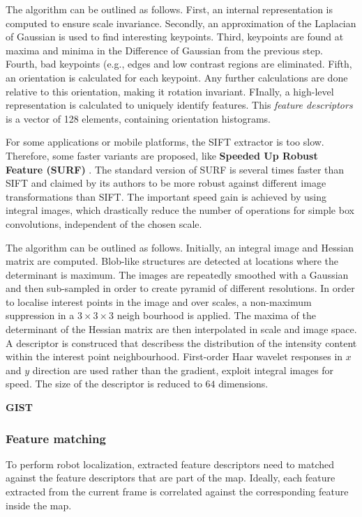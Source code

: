 The algorithm can be outlined as follows.
First, an internal representation is computed to ensure scale invariance.
Secondly, an approximation of the Laplacian of Gaussian is used to find interesting keypoints.
Third, keypoints are found at maxima and minima in the Difference of Gaussian from the previous step.
Fourth, bad keypoints (e.g., edges and low contrast regions are eliminated.
Fifth, an orientation is calculated for each keypoint.
Any further calculations are done relative to this orientation, making it rotation invariant.
FInally, a high-level representation is calculated to uniquely identify features.
This \textit{feature descriptors} is a vector of 128 elements, containing orientation histograms.

For some applications or mobile platforms, the SIFT extractor is too slow.
Therefore, some faster variants are proposed, like \textbf{Speeded Up Robust Feature (SURF)} \cite{Bay2008cviu}.
The standard version of SURF is several times faster than SIFT and claimed by its authors to be more robust against different image transformations than SIFT.
The important speed gain is achieved by using integral images, which drastically reduce the number of operations for simple box convolutions, independent of the chosen scale.

The algorithm can be outlined as follows.
Initially, an integral image and  Hessian matrix are computed.
Blob-like structures are detected at locations where the determinant is maximum.
The images are repeatedly smoothed with a Gaussian and then sub-sampled in order to create pyramid of different resolutions.
In order to localise interest points in the image and over scales, a non-maximum suppression in a $3 \times 3 \times 3$ neigh bourhood is applied. 
The maxima of the determinant of the Hessian matrix are then interpolated in scale and image space.
A descriptor is construced that describess the distribution of the intensity content within the interest point neighbourhood.
First-order Haar wavelet responses in $x$ and $y$ direction are used rather than the gradient, exploit integral images for speed. The size of the descriptor is reduced to $64$ dimensions.

\textbf{GIST}

\subsubsection{Feature matching}
\label{sec:theory_feature_matching}
To perform robot localization, extracted feature descriptors need to matched against the feature descriptors that are part of the map.
Ideally, each feature extracted from the current frame is correlated against the corresponding feature inside the map.

